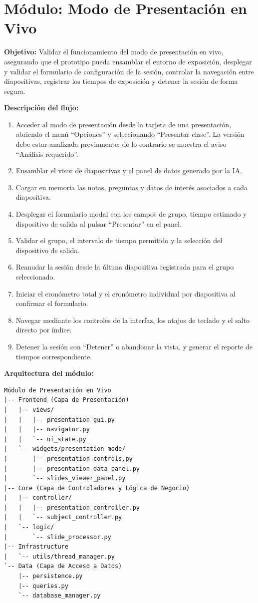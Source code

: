 \documentclass[12pt,letterpaper]{article}
\begin{document}
\section*{Módulo: Modo de Presentación en Vivo}

\textbf{Objetivo:} Validar el funcionamiento del modo de presentación en vivo, asegurando que el prototipo pueda ensamblar el entorno de exposición, desplegar y validar el formulario de configuración de la sesión, controlar la navegación entre diapositivas, registrar los tiempos de exposición y detener la sesión de forma segura.

\textbf{Descripción del flujo:}
\begin{enumerate}
    \item Acceder al modo de presentación desde la tarjeta de una presentación, abriendo el menú ``Opciones'' y seleccionando ``Presentar clase''. La versión debe estar analizada previamente; de lo contrario se muestra el aviso ``Análisis requerido''.
    \item Ensamblar el visor de diapositivas y el panel de datos generado por la IA.
    \item Cargar en memoria las notas, preguntas y datos de interés asociados a cada diapositiva.
    \item Desplegar el formulario modal con los campos de grupo, tiempo estimado y dispositivo de salida al pulsar ``Presentar'' en el panel.
    \item Validar el grupo, el intervalo de tiempo permitido y la selección del dispositivo de salida.
    \item Reanudar la sesión desde la última diapositiva registrada para el grupo seleccionado.
    \item Iniciar el cronómetro total y el cronómetro individual por diapositiva al confirmar el formulario.
    \item Navegar mediante los controles de la interfaz, los atajos de teclado y el salto directo por índice.
    \item Detener la sesión con ``Detener'' o abandonar la vista, y generar el reporte de tiempos correspondiente.
\end{enumerate}

\textbf{Arquitectura del módulo:}
\begin{verbatim}
Módulo de Presentación en Vivo
|-- Frontend (Capa de Presentación)
|   |-- views/
|   |   |-- presentation_gui.py
|   |   |-- navigator.py
|   |   `-- ui_state.py
|   `-- widgets/presentation_mode/
|       |-- presentation_controls.py
|       |-- presentation_data_panel.py
|       `-- slides_viewer_panel.py
|-- Core (Capa de Controladores y Lógica de Negocio)
|   |-- controller/
|   |   |-- presentation_controller.py
|   |   `-- subject_controller.py
|   `-- logic/
|       `-- slide_processor.py
|-- Infrastructure
|   `-- utils/thread_manager.py
`-- Data (Capa de Acceso a Datos)
    |-- persistence.py
    |-- queries.py
    `-- database_manager.py
\end{verbatim}
\end{document}

